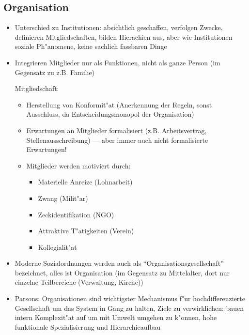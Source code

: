 \subsection{Organisation}
\begin{itemize}
	\item
		Unterschied zu Institutionen: absichtlich geschaffen, verfolgen Zwecke, definieren Mitgliedschaften, bilden Hierachien aus, aber wie Institutionen soziale Ph"anomene, keine sachlich fassbaren Dinge
	\item
		Integrieren Mitglieder nur als Funktionen, nicht als ganze Person (im Gegensatz zu z.B. Familie)

		Mitgliedschaft:
		\begin{itemize}
			\item
				Herstellung von Konformit"at (Anerkennung der Regeln, sonst Ausschluss, da Entscheidungsmonopol der Organisation)
			\item
				Erwartungen an Mitglieder formalisiert (z.B. Arbeitsvertrag, Stellenausschreibung) --- aber immer auch nicht formalisierte Erwartungen!
			\item
				Mitglieder werden motiviert durch:
				\begin{itemize}
					\item
						Materielle Anreize (Lohnarbeit)
					\item
						Zwang (Milit"ar)
					\item
						Zeckidentifikation (NGO)
					\item
						Attraktive T"atigkeiten (Verein)
					\item
						Kollegialit"at
				\end{itemize}
		\end{itemize}
	\item
		Moderne Sozialordnungen werden auch als \enquote{Organisationsgesellschaft} bezeichnet, alles ist Organisation (im Gegensatz zu Mittelalter, dort nur einzelne Teilbereiche (Verwaltung, Kirche))
	\item
		Parsons: Organisationen sind wichtigster Mechanismus f"ur hochdifferenzierte Gesellschaft um das System in Gang zu halten, Ziele zu verwirklichen: bauen intern Komplexit"at auf um mit Umwelt umgehen zu k"onnen, hohe funktionale Spezialisierung und Hierarchieaufbau


\end{itemize}
